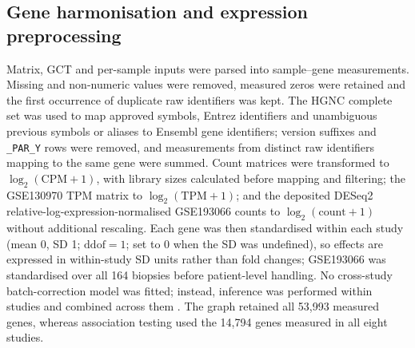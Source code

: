 \documentclass[11pt,a4paper]{article}
\begin{document}
\subsection*{Gene harmonisation and expression preprocessing}
Matrix, GCT and per-sample inputs were parsed into sample--gene measurements. Missing and non-numeric values were removed, measured zeros were retained and the first occurrence of duplicate raw identifiers was kept. The HGNC complete set was used to map approved symbols, Entrez identifiers and unambiguous previous symbols or aliases to Ensembl gene identifiers; version suffixes and \texttt{\_PAR\_Y} rows were removed, and measurements from distinct raw identifiers mapping to the same gene were summed. Count matrices were transformed to $\log_2(\mathrm{CPM}+1)$, with library sizes calculated before mapping and filtering; the GSE130970 TPM matrix to $\log_2(\mathrm{TPM}+1)$; and the deposited DESeq2 \cite{love2014} relative-log-expression-normalised GSE193066 counts to $\log_2(\mathrm{count}+1)$ without additional rescaling. Each gene was then standardised within each study (mean 0, SD 1; $\mathrm{ddof}=1$; set to 0 when the SD was undefined), so effects are expressed in within-study SD units rather than fold changes; GSE193066 was standardised over all 164 biopsies before patient-level handling. No cross-study batch-correction model was fitted; instead, inference was performed within studies and combined across them \cite{ramasamy2008}. The graph retained all 53,993 measured genes, whereas association testing used the 14,794 genes measured in all eight studies.
\end{document}
